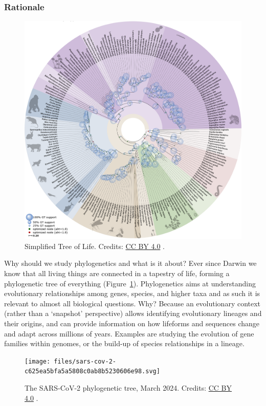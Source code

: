 \subsubsection{Rationale}


\begin{figure}[!htbp]
\centering
\includegraphics[width=0.5\linewidth]{files/tree-of-life_alt-af7529eddf9e121b8f98d25d1b99b119.png}
\caption[]{Simplified Tree of Life. Credits: \newline
\href{https://creativecommons.org/licenses/by/4.0/}{CC BY 4.0} \cite{tree_of_life_alt_2014}.}
\label{tree_of_life_alt}
\end{figure}

Why should we study phylogenetics and what is it about?
Ever since Darwin we know that all living things are connected in a tapestry of life, forming a phylogenetic tree of everything (Figure~\ref{tree_of_life_alt}).
Phylogenetics aims at understanding evolutionary relationships among genes, species, and higher taxa and as such it is relevant to almost all biological questions.
Why? Because an evolutionary context (rather than a `snapshot' perspective) allows identifying evolutionary lineages and their origins, and can provide information on how lifeforms and sequences change and adapt across millions of years.
Examples are studying the evolution of gene families within genomes, or the build-up of species relationships in a lineage.

\begin{figure}[!htbp]
\centering
\texttt{[image: files/sars-cov-2-c625ea5bfa5a5808c0ab8b5230606e98.svg]}
\caption[]{The SARS-CoV-2 phylogenetic tree, March 2024.
Credits: \href{https://creativecommons.org/licenses/by/4.0/}{CC BY 4.0} \cite{sars-cov-2_2018}.}
\label{sars-cov-2}
\end{figure}

